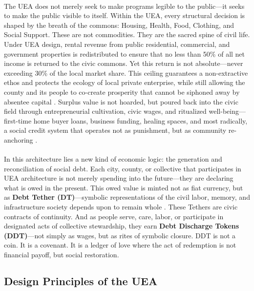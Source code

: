 \documentclass[12pt]{article}
\begin{document}
\paragraph{}The UEA does not merely seek to make programs legible to the public—it seeks to make the public visible to itself. Within the UEA, every structural decision is shaped by the breath of the commons: Housing, Health, Food, Clothing, and Social Support. These are not commodities. They are the sacred spine of civil life. Under UEA design, rental revenue from public residential, commercial, and government properties is redistributed to ensure that no less than 50\% of all net income is returned to the civic commons. Yet this return is not absolute—never exceeding 30\% of the local market share. This ceiling guarantees a non-extractive ethos and protects the ecology of local private enterprise, while still allowing the county and its people to co-create prosperity that cannot be siphoned away by absentee capital \cite{kelly2012new}. Surplus value is not hoarded, but poured back into the civic field through entrepreneurial cultivation, civic wages, and ritualized well-being—first-time home buyer loans, business funding, healing spaces, and most radically, a social credit system that operates not as punishment, but as community re-anchoring \cite{brown2022civic}.

\paragraph{}In this architecture lies a new kind of economic logic: the generation and reconciliation of social debt. Each city, county, or collective that participates in UEA architecture is not merely spending into the future—they are declaring what is owed in the present. This owed value is minted not as fiat currency, but as \textbf{Debt Tether (DT)}—symbolic representations of the civil labor, memory, and infrastructure society depends upon to remain whole \cite{graeber2011debt}. These Tethers are civic contracts of continuity. And as people serve, care, labor, or participate in designated acts of collective stewardship, they earn \textbf{Debt Discharge Tokens (DDT)}—not simply as wages, but as rites of symbolic closure. DDT is not a coin. It is a covenant. It is a ledger of love where the act of redemption is not financial payoff, but social restoration.

\subsection{Design Principles of the UEA}
\end{document}
